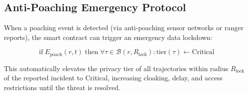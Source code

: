 \subsection{Anti-Poaching Emergency Protocol}

When a poaching event is detected (via anti-poaching sensor networks or ranger reports), the smart contract can trigger an emergency data lockdown:

\begin{equation}
\text{if}\; E_{\text{poach}}(r, t) \;\text{then}\; \forall \tau \in \mathcal{B}(r, R_{\text{lock}}) : \text{tier}(\tau) \leftarrow \text{Critical}
\end{equation}

This automatically elevates the privacy tier of all trajectories within radius $R_{\text{lock}}$ of the reported incident to Critical, increasing cloaking, delay, and access restrictions until the threat is resolved.

